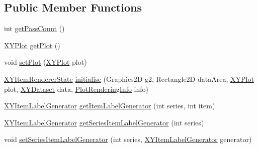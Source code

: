 \subsection*{Public Member Functions}
\begin{DoxyCompactItemize}
\item 
int \mbox{\hyperlink{classorg_1_1jfree_1_1chart_1_1renderer_1_1xy_1_1_abstract_x_y_item_renderer_a9b42eebf833856cc8d92f6aa968e93e7}{get\+Pass\+Count}} ()
\item 
\mbox{\hyperlink{classorg_1_1jfree_1_1chart_1_1plot_1_1_x_y_plot}{X\+Y\+Plot}} \mbox{\hyperlink{classorg_1_1jfree_1_1chart_1_1renderer_1_1xy_1_1_abstract_x_y_item_renderer_a1392aa3430b50260aecc9e0622c214c3}{get\+Plot}} ()
\item 
void \mbox{\hyperlink{classorg_1_1jfree_1_1chart_1_1renderer_1_1xy_1_1_abstract_x_y_item_renderer_a6e2df4ddb60eb293a77d7994f316876d}{set\+Plot}} (\mbox{\hyperlink{classorg_1_1jfree_1_1chart_1_1plot_1_1_x_y_plot}{X\+Y\+Plot}} plot)
\item 
\mbox{\hyperlink{classorg_1_1jfree_1_1chart_1_1renderer_1_1xy_1_1_x_y_item_renderer_state}{X\+Y\+Item\+Renderer\+State}} \mbox{\hyperlink{classorg_1_1jfree_1_1chart_1_1renderer_1_1xy_1_1_abstract_x_y_item_renderer_a42c46a825965289dd60f51b28572ce03}{initialise}} (Graphics2D g2, Rectangle2D data\+Area, \mbox{\hyperlink{classorg_1_1jfree_1_1chart_1_1plot_1_1_x_y_plot}{X\+Y\+Plot}} plot, \mbox{\hyperlink{interfaceorg_1_1jfree_1_1data_1_1xy_1_1_x_y_dataset}{X\+Y\+Dataset}} data, \mbox{\hyperlink{classorg_1_1jfree_1_1chart_1_1plot_1_1_plot_rendering_info}{Plot\+Rendering\+Info}} info)
\item 
\mbox{\hyperlink{interfaceorg_1_1jfree_1_1chart_1_1labels_1_1_x_y_item_label_generator}{X\+Y\+Item\+Label\+Generator}} \mbox{\hyperlink{classorg_1_1jfree_1_1chart_1_1renderer_1_1xy_1_1_abstract_x_y_item_renderer_ab27f431c89d3468100e51b8091d4e570}{get\+Item\+Label\+Generator}} (int series, int item)
\item 
\mbox{\hyperlink{interfaceorg_1_1jfree_1_1chart_1_1labels_1_1_x_y_item_label_generator}{X\+Y\+Item\+Label\+Generator}} \mbox{\hyperlink{classorg_1_1jfree_1_1chart_1_1renderer_1_1xy_1_1_abstract_x_y_item_renderer_a84c79d82b5bc9b856836ca5166a71b41}{get\+Series\+Item\+Label\+Generator}} (int series)
\item 
void \mbox{\hyperlink{classorg_1_1jfree_1_1chart_1_1renderer_1_1xy_1_1_abstract_x_y_item_renderer_aaa4e921655f5d328755f03806ce2c806}{set\+Series\+Item\+Label\+Generator}} (int series, \mbox{\hyperlink{interfaceorg_1_1jfree_1_1chart_1_1labels_1_1_x_y_item_label_generator}{X\+Y\+Item\+Label\+Generator}} generator)

\end{DoxyCompactItemize}
